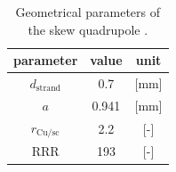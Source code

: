 \begin{table}[H]
    \caption{Geometrical parameters of the skew quadrupole \cite{hl_lhc_tech_design_report_v01, marco_prioli_mails}.} 
    \vspace{-1.em} 
    \fontsize{10}{10}
    \selectfont 
    \renewcommand{\arraystretch}{1.5}
    \begin{center}
    \begin{tabular}{ ccc }  
    \hline
    parameter & value & unit \\
    \hline
    $d_\text{strand}$ & 0.7 & [mm] \\
    $a$ & 0.941 & [mm] \\
    $r_\text{Cu/sc}$ & 2.2 & [-] \\
    RRR & 193 & [-] \\  
    \hline 
    \end{tabular}
    \end{center}  
     \label{table:skew_quad_params_table_basic} 
 \end{table}
